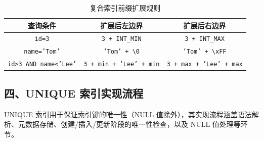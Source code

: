 \documentclass[a4paper, 12pt]{article}
\begin{document}
\begin{table}[h]
\centering
\begin{tabular}{|c|c|c|}
\hline
\textbf{查询条件} & \textbf{扩展后左边界} & \textbf{扩展后右边界} \\
\hline
\texttt{id=3} & \texttt{3 + INT\_MIN} & \texttt{3 + INT\_MAX} \\
\hline
\texttt{name='Tom'} & \texttt{'Tom' + \textbackslash{}0} & \texttt{'Tom' + \textbackslash{}xFF} \\
\hline
\texttt{id>3 AND name<'Lee'} & \texttt{3 + min + 'Lee' + min} & \texttt{3 + max + 'Lee' + max} \\
\hline
\end{tabular}
\caption{复合索引前缀扩展规则}
\end{table}

\subsection{四、UNIQUE 索引实现流程}
UNIQUE 索引用于保证索引键的唯一性（NULL 值除外），其实现流程涵盖语法解析、元数据存储、创建/插入/更新阶段的唯一性检查，以及 NULL 值处理等环节。
\end{document}
